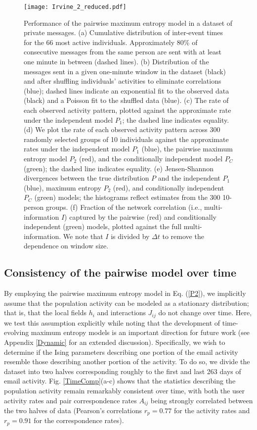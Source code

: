 \documentclass[aps,reprint,superscriptaddress,amsmath,amssymb,longbibliography]{revtex4-1}
\begin{document}
\begin{figure*}
\texttt{[image: Irvine\_2\_reduced.pdf]}
\caption{\label{Irvine_fig} Performance of the pairwise maximum entropy model in a dataset of private messages. (a) Cumulative distribution of inter-event times for the 66 most active individuals. Approximately 80\% of consecutive messages from the same person are sent with at least one minute in between (dashed lines). (b) Distribution of the messages sent in a given one-minute window in the dataset (black) and after shuffling individuals' activities to eliminate correlations (blue); dashed lines indicate an exponential fit to the observed data (black) and a Poisson fit to the shuffled data (blue). (c) The rate of each observed activity pattern, plotted against the approximate rate under the independent model $P_1$; the dashed line indicates equality. (d) We plot the rate of each observed activity pattern across 300 randomly selected groups of 10 individuals against the approximate rates under the independent model $P_1$ (blue), the pairwise maximum entropy model $P_2$ (red), and the conditionally independent model $P_C$ (green); the dashed line indicates equality. (e) Jensen-Shannon divergences between the true distribution $P$ and the independent $P_1$ (blue), maximum entropy $P_2$ (red), and conditionally independent $P_C$ (green) models; the histograms reflect estimates from the 300 10-person groups. (f) Fraction of the network correlation (i.e., multi-information $I$) captured by the pairwise (red) and conditionally independent (green) models, plotted against the full multi-information. We note that $I$ is divided by $\Delta t$ to remove the dependence on window size.}
\end{figure*}

\subsection{Consistency of the pairwise model over time}

\label{Consistency}

By employing the pairwise maximum entropy model in Eq. (\ref{P2}), we implicitly assume that the population activity can be modeled as a stationary distribution; that is, that the local fields $h_i$ and interactions $J_{ij}$ do not change over time. Here, we test this assumption explicitly while noting that the development of time-evolving maximum entropy models is an important direction for future work (see Appendix \ref{Dynamic} for an extended discussion). Specifically, we wish to determine if the Ising parameters describing one portion of the email activity resemble those describing another portion of the activity. To do so, we divide the dataset into two halves corresponding roughly to the first and last 263 days of email activity. Fig. \ref{TimeComp}(a-c) shows that the statistics describing the population activity remain remarkably consistent over time, with both the user activity rates and pair correspondence rates $A_{ij}$ being strongly correlated between the two halves of data (Pearson's correlations $r_p = 0.77$ for the activity rates and $r_p = 0.91$ for the correspondence rates).
\end{document}
